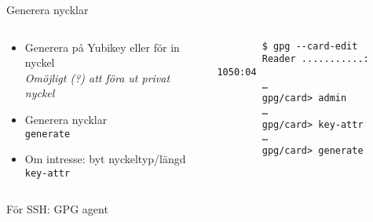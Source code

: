 \documentclass{beamer}
\begin{document}
\begin{frame}[fragile]{Generera nycklar}
  \begin{columns}
    \begin{column}{0.6\linewidth}
      \begin{itemize}
        \item Generera på Yubikey eller för in nyckel\\
          {\small\emph{Omöjligt (?) att föra ut privat nyckel}}
        \item Generera nycklar\\
          \texttt{generate}
        \item Om intresse: byt nyckeltyp/längd\\
          \texttt{key-attr}
      \end{itemize}
    \end{column}
    \begin{column}{0.4\linewidth}
      \begin{verbatim}
        $ gpg --card-edit
        Reader ...........: 1050:04
        …
        gpg/card> admin
        …
        gpg/card> key-attr
        …
        gpg/card> generate
      \end{verbatim}
    \end{column}
  \end{columns}
\end{frame}

\begin{frame}[fragile]{För SSH: GPG agent}
\end{frame}
\end{document}
